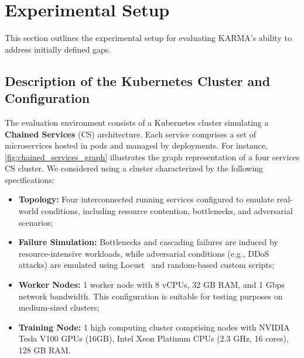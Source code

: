 \documentclass[conference]{IEEEtran}
\begin{document}
\section{Experimental Setup}
\label{sec:experiments}

This section outlines the experimental setup for evaluating KARMA's ability to address initially defined gaps.

\subsection{Description of the Kubernetes Cluster and Configuration}

The evaluation environment consists of a Kubernetes cluster simulating a \textbf{Chained Services} (CS) architecture. Each service comprises a set of microservices hosted in pods and managed by deployments. For instance, \autoref{fig:chained_services_graph} illustrates the graph representation of a four services CS cluster. We considered using a cluster characterized by the following specifications:

\begin{itemize}
    \item \textbf{Topology:} Four interconnected running services configured to emulate real-world conditions, including resource contention, bottlenecks, and adversarial scenarios;
    \item \textbf{Failure Simulation:} Bottlenecks and cascading failures are induced by resource-intensive workloads, while adversarial conditions (e.g., DDoS attacks) are emulated using Locust~\cite{locust2021} and random-based custom scripts;
    \item \textbf{Worker Nodes:} 1 worker node with 8 vCPUs, 32 GB RAM, and 1 Gbps network bandwidth. This configuration is suitable for testing purposes on medium-sized clusters;
    \item \textbf{Training Node:} 1 high computing cluster comprising nodes with NVIDIA Tesla V100 GPUs (16GB), Intel Xeon Platinum CPUs (2.3 GHz, 16 cores), 128 GB RAM.
\end{itemize}
\end{document}
